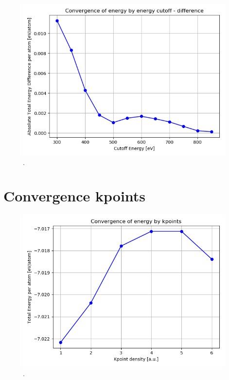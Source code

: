 \documentclass{article}
\begin{document}
  \begin{figure}[H]
      \centering
      \includegraphics[width = 11cm]{../fig/convergence_energy_difference.png}
      \caption{. }
      \label{fig:convergence_energy_difference.png}
  \end{figure}

\vspace{1cm}

\section{Convergence kpoints}

  \begin{figure}[H]
      \centering
      \includegraphics[width = 11cm]{../fig/convergence_kpoints.png}
      \caption{. }
      \label{fig:convergence_kpoints.png}
  \end{figure}
\end{document}
